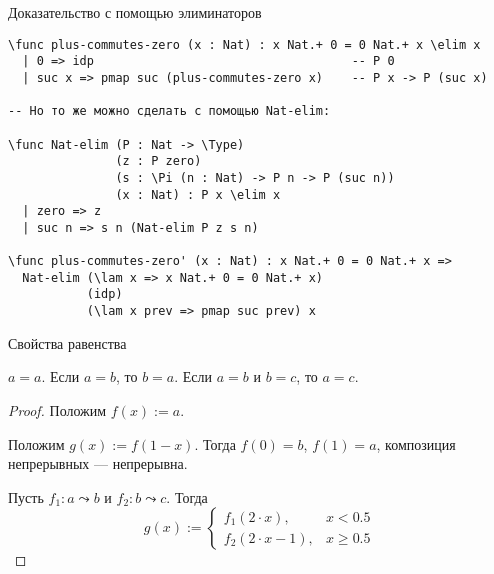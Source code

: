 \documentclass[aspectratio=169,dvipsnames,usenames]{beamer}
\begin{document}
\begin{frame}[fragile]{Доказательство с помощью элиминаторов}
\small\color[HTML]{025002}\begin{verbatim}
\func plus-commutes-zero (x : Nat) : x Nat.+ 0 = 0 Nat.+ x \elim x
  | 0 => idp                                    -- P 0
  | suc x => pmap suc (plus-commutes-zero x)    -- P x -> P (suc x)

-- Но то же можно сделать с помощью Nat-elim:

\func Nat-elim (P : Nat -> \Type)
               (z : P zero)
               (s : \Pi (n : Nat) -> P n -> P (suc n))
               (x : Nat) : P x \elim x
  | zero => z
  | suc n => s n (Nat-elim P z s n)

\func plus-commutes-zero' (x : Nat) : x Nat.+ 0 = 0 Nat.+ x =>
  Nat-elim (\lam x => x Nat.+ 0 = 0 Nat.+ x) 
           (idp) 
           (\lam x prev => pmap suc prev) x
\end{verbatim}\normalsize
\color{black}
\end{frame}


\begin{frame}{Свойства равенства}
\begin{thm}
$a = a$.
Если $a = b$, то $b = a$.
Если $a = b$ и $b = c$, то $a = c$.
\end{thm}
\begin{proof}
Положим $f(x) := a$.

Положим $g(x) := f(1 - x)$. Тогда $f(0) = b$, $f(1) = a$, композиция непрерывных --- непрерывна.

Пусть $f_1: a \leadsto b$ и $f_2: b \leadsto c$.
Тогда $$g(x) := \left\{\begin{array}{ll}f_1(2\cdot x),& x < 0.5\\f_2(2\cdot x -1),& x\ge 0.5\end{array}\right.$$
\end{proof}
\end{frame}
\end{document}
